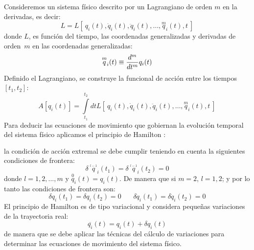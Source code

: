 \documentclass[a4paper,12pt]{article}
\begin{document}
Consideremos un sistema físico descrito por un Lagrangiano de orden $m$ en la derivadas, es decir:
\begin{equation}
L=L[\ q_i(t),\dot q_i(t),\ddot q_i(t),\dotso,\overset{m}{q}_i(t),t \ ]
\label{lagram}
\end{equation}
donde $L$, es función del tiempo, las coordenadas generalizadas y derivadas de \mbox{orden $m$} en las coordenadas generalizadas:
\begin{equation}
\overset{m}{q}_i(t)\equiv{ d^m\over dt^m }q_i(t) 
\end{equation}
Definido el Lagrangiano, se construye la funcional de acción entre los tiempos $[t_1,t_2]$:
\begin{equation}
A[q_i(t)]=\int\limits_{t_1}^{t_2}dtL[\ q_i(t),\dot q_i(t),\ddot q_i(t),\dotso,\overset{m}{q}_i(t),t \ ]
\label{acc} 
\end{equation}
Para deducir las ecuaciones de movimiento que gobiernan la evolución temporal del sistema físico aplicamos el principio de Hamilton \cite{hamilton,feyman2}:
\\
\begin{center}
\end{center}
la condición de acción extremal se debe cumplir teniendo en cuenta la siguientes condiciones de frontera:
\begin{equation}
\delta\ \overset{_{l-1}}{q}_i(t_1)=\delta \ \overset{_{l-1}}{q}_i(t_2)=0 
\label{fronfi}
\end{equation}
donde $l=1,2,...,m$ y $\overset{0}{q}_i(t)=q_i(t)$. De manera que si \mbox{$m=2$}, \mbox{$l=1,2$}; y por lo tanto las condiciones de frontera son:
\begin{equation}
\delta {q}_i(t_1) =\delta {q}_i(t_2)=0 \ \ \ \ \ \ \ \ \delta \dot{q}_i(t_1) =\delta \dot{q}_i(t_2)=0
\end{equation}
El principio de Hamilton es de tipo variacional y considera pequeñas variaciones de la trayectoria real:
\begin{equation}
\overline{q_i}(t)=q_i(t)+\delta q_i(t) 
\end{equation}
de manera que se debe aplicar las técnicas del cálculo de variaciones para determinar las ecuaciones de movimiento del sistema físico.
\\
\end{document}
